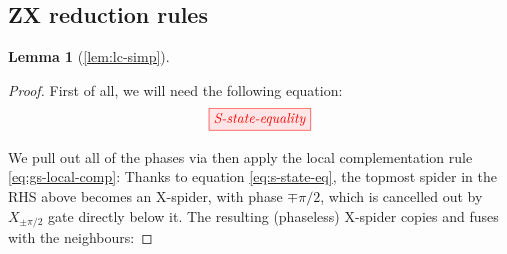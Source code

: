 \documentclass[a4paper,onecolumn,superscriptaddress,11pt,accepted=2020-04-27]{quantumarticle}
\newcommand{\symd}{\mathbin{\Delta}\xspace}
\newcommand{\Symdi}[1]{\underset{\scriptstyle #1}{\scalebox{1.5}{$\symd$}}\,}
\newcommand{\odd}[2]{\textsf{Odd}_{#1}\left(#2\right)}
\theoremstyle{definition}
\newtheorem*{lemma*}{Lemma}
\newcommand{\NOTEj}[1]{\marginpar{\footnotesize {\color{purple} \noindent\textbf{j:} #1}}}
\begin{document}
%
%

\subsection{ZX reduction rules}
\label{sec:zx-reduction-rules}

\begin{lemma*}[\ref{lem:lc-simp}]~
\end{lemma*}
\begin{proof}
First of all, we will need the following equation:
  \begin{equation}\label{eq:s-state-eq}
  \hfill\tikzfig{S-state-equality}\hfill
  \end{equation}

  We pull out all of the phases via \SpiderRule then apply the local complementation rule \eqref{eq:gs-local-comp}:
  Thanks to equation \eqref{eq:s-state-eq}, the topmost spider in the RHS above becomes an X-spider, with phase $\mp \pi/2$, which is cancelled out by $X_{\pm \pi/2}$ gate directly below it. The resulting (phaseless) X-spider copies and fuses with the neighbours:
\end{proof}
\end{document}
